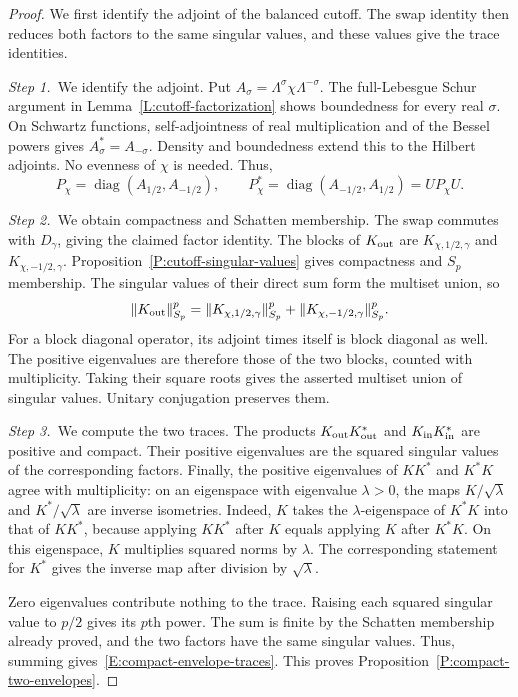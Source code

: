 \begin{proof}
  We first identify the adjoint of the balanced cutoff. The swap identity
  then reduces both factors to the same singular values, and these values
  give the trace identities.

  \medskip
  \noindent\textit{Step 1.~}We identify the adjoint.
  Put $A_\sigma = \Lambda^\sigma\chi\Lambda^{-\sigma}$. The full-Lebesgue Schur
  argument in Lemma~\ref{L:cutoff-factorization} shows boundedness for every
  real $\sigma$. On Schwartz functions, self-adjointness of real multiplication
  and of the Bessel powers gives $A_\sigma^* = A_{-\sigma}$. Density and
  boundedness extend this to the Hilbert adjoints. No evenness of $\chi$ is
  needed. Thus,
  \[
    P_\chi=\operatorname{diag}(A_{1/2},A_{-1/2}),\qquad
    P_\chi^*=\operatorname{diag}(A_{-1/2},A_{1/2})=UP_\chi U.
  \]

  \medskip
  \noindent\textit{Step 2.~}We obtain compactness and Schatten membership.
  The swap commutes with $D_\gamma$, giving the claimed factor identity. The
  blocks of $K_{\rm out}$ are $K_{\chi,1/2,\gamma}$ and $K_{\chi,-1/2,\gamma}$.
  Proposition~\ref{P:cutoff-singular-values} gives compactness and $S_p$
  membership. The singular values of their direct sum form the multiset union,
  so
  \[
    \|K_{\rm out}\|_{S_p}^p
    =\|K_{\chi,1/2,\gamma}\|_{S_p}^p+
    \|K_{\chi,-1/2,\gamma}\|_{S_p}^p.
  \]
  For a block diagonal operator, its adjoint times itself is block diagonal as
  well. The positive eigenvalues are therefore those of the two blocks,
  counted with multiplicity. Taking their square roots gives the asserted
  multiset union of singular values.
  Unitary conjugation preserves them.

  \medskip
  \noindent\textit{Step 3.~}We compute the two traces.
  The products $K_{\rm out}K_{\rm out}^*$ and $K_{\rm in}K_{\rm in}^*$ are
  positive and compact. Their positive eigenvalues are the squared singular
  values of the corresponding factors.
  Finally, the positive eigenvalues of
  $KK^*$ and $K^*K$ agree with multiplicity: on an eigenspace with eigenvalue
  $\lambda > 0$, the maps $K/\sqrt\lambda$ and $K^*/\sqrt\lambda$ are inverse
  isometries. Indeed, $K$ takes the $\lambda$-eigenspace of $K^*K$ into that
  of $KK^*$, because applying $KK^*$ after $K$ equals applying $K$ after
  $K^*K$. On this eigenspace, $K$ multiplies squared norms by $\lambda$. The
  corresponding statement for $K^*$ gives the inverse map after division by
  $\sqrt\lambda$.

  Zero eigenvalues contribute nothing to the trace. Raising each squared
  singular value to $p/2$ gives its $p$th power. The sum is finite by the
  Schatten membership already proved, and the two factors have the same
  singular values. Thus, summing gives~\eqref{E:compact-envelope-traces}. This
  proves
  Proposition~\ref{P:compact-two-envelopes}.
\end{proof}

